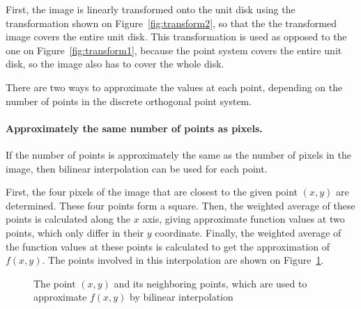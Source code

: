 First, the image is linearly transformed onto the unit disk using the transformation shown on Figure~\ref{fig:transform2}, so that the the transformed image covers the entire unit disk. This transformation is used as opposed to the one on Figure~\ref{fig:transform1}, because the point system covers the entire unit disk, so the image also has to cover the whole disk.

There are two ways to approximate the values at each point, depending on the number of points in the discrete orthogonal point system.

\paragraph{Approximately the same number of points as pixels.}
If the number of points is approximately the same as the number of pixels in the image, then bilinear interpolation can be used for each point.

First, the four pixels of the image that are closest to the given point $(x,y)$ are determined. These four points form a square. Then, the weighted average of these points is calculated along the $x$ axis, giving approximate function values at two points, which only differ in their $y$ coordinate. Finally, the weighted average of the function values at these points is calculated to get the approximation of $f(x,y)$. The points involved in this interpolation are shown on Figure~\ref{fig:bilinear}.

\begin{figure}[tb]
    \centering

    \caption{The point $(x,y)$ and its neighboring points, which are used to approximate $f(x,y)$ by bilinear interpolation}
    \label{fig:bilinear}
\end{figure}

